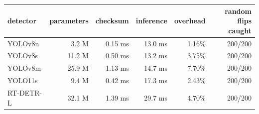 \begin{tabular}{lrrrrr}
\toprule
detector & parameters & checksum & inference & overhead & random flips caught \\
\midrule
YOLOv8n & 3.2 M & 0.15 ms & 13.0 ms & 1.16\% & 200/200 \\
YOLOv8s & 11.2 M & 0.50 ms & 13.2 ms & 3.75\% & 200/200 \\
YOLOv8m & 25.9 M & 1.13 ms & 14.7 ms & 7.70\% & 200/200 \\
YOLO11s & 9.4 M & 0.42 ms & 17.3 ms & 2.43\% & 200/200 \\
RT-DETR-L & 32.1 M & 1.39 ms & 29.7 ms & 4.70\% & 200/200 \\
\bottomrule
\end{tabular}

